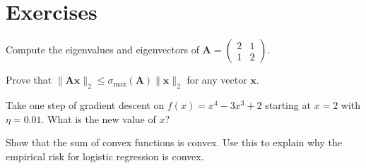 \section{Exercises}

\begin{exercise}
	Compute the eigenvalues and eigenvectors of $\mathbf{A} = \begin{pmatrix} 2 & 1 \\ 1 & 2 \end{pmatrix}$.
\end{exercise}

\begin{exercise}
	Prove that $\|\mathbf{A}\mathbf{x}\|_2 \leq \sigma_{\max}(\mathbf{A}) \|\mathbf{x}\|_2$ for any vector $\mathbf{x}$.
\end{exercise}

\begin{exercise}
	Take one step of gradient descent on $f(x) = x^4 - 3x^3 + 2$ starting at $x = 2$ with $\eta = 0.01$. What is the new value of $x$?
\end{exercise}

\begin{exercise}
	Show that the sum of convex functions is convex. Use this to explain why the empirical risk for logistic regression is convex.
\end{exercise}
